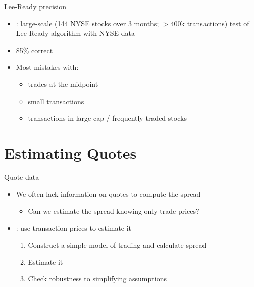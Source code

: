 \documentclass[english,10pt
,aspectratio=169
]{beamer}
\begin{document}
\begin{frame}{Lee-Ready precision}
	\begin{itemize}
		\item \citet{odders-white_occurrence_2000}: large-scale (144 NYSE stocks over 3 months; $>400$k transactions) test of Lee-Ready algorithm with NYSE data
		\item 85\% correct
		\item Most mistakes with:
		\pause 
		\begin{itemize}
			\item trades at the midpoint
			\item small transactions
			\item transactions in large-cap / frequently traded stocks
		\end{itemize}
	\end{itemize}
\end{frame}



\section{Estimating Quotes}


\begin{frame}{Quote data}
	\begin{itemize}
		\item We often lack information on quotes to compute the spread
		\begin{itemize}
			\item Can we estimate the spread knowing only trade prices?
		\end{itemize}
		\item \citet{roll_simple_1984}: use transaction prices to estimate it
		\begin{enumerate}
			\item Construct a simple model of trading and calculate spread
			\item Estimate it
			\item Check robustness to simplifying assumptions
		\end{enumerate}
	\end{itemize}
\end{frame}
\end{document}
